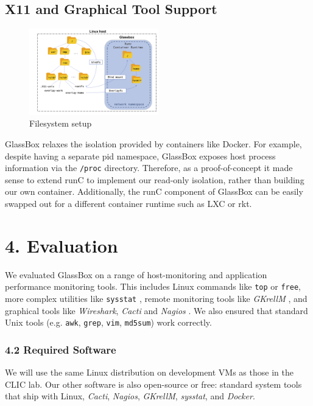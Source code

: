 \documentclass{proc}
\begin{document}
\subsection*{X11 and Graphical Tool Support}





\begin{figure}
\includegraphics[width=0.5\textwidth]{fs_diagram}
\caption{Filesystem setup}
\end{figure}

GlassBox relaxes the isolation provided by containers like Docker. For example, despite having a separate pid namespace, GlassBox exposes host process information via the \texttt{/proc} directory. Therefore, as a proof-of-concept it made sense to extend runC to implement our read-only isolation, rather than building our own container. Additionally, the runC component of GlassBox can be easily swapped out for a different container runtime such as LXC or rkt.
\section*{4. Evaluation}

We evaluated GlassBox on a range of host-monitoring and application performance monitoring tools. This includes Linux commands like \texttt{top} or \texttt{free}, more complex utilities like \texttt{sysstat} \cite{sysstat}, remote monitoring tools like \textit{GKrellM} \cite{gkrellm}, and graphical tools like \textit{Wireshark}, \textit{Cacti} \cite{cacti} and \textit{Nagios} \cite{nagios}. We also ensured that standard Unix tools (e.g. \texttt{awk}, \texttt{grep}, \texttt{vim}, \texttt{md5sum}) work correctly.
\subsubsection*{4.2 Required Software}

We will use the same Linux distribution on development VMs as those in the CLIC lab. Our other software is also open-source or free: standard system tools that ship with Linux, \textit{Cacti}, \textit{Nagios}, \textit{GKrellM}, \textit{sysstat}, and \textit{Docker}.
\end{document}

